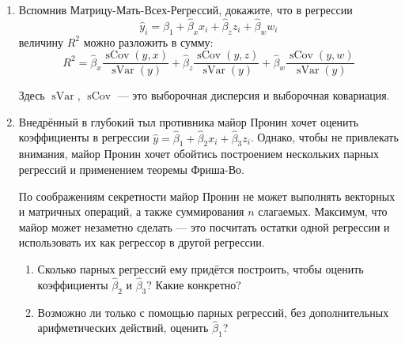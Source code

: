 \documentclass[12pt]{article} %
\theoremstyle{definition} %
\DeclareMathOperator{\sCov}{sCov}
\DeclareMathOperator{\sVar}{sVar}
\def \hb{\hat{\beta}}
\begin{document}
\begin{enumerate}
\newpage
\item Вспомнив Матрицу-Мать-Всех-Регрессий, докажите, что
в регрессии
\[
\hat y_i = \hat\beta_1 + \hat \beta_x x_i + \hat \beta_z z_i + \hat \beta_w w_i
\]
величину $R^2$ можно разложить в сумму:
\[
R^2 = \hat \beta_x \frac{\sCov(y, x)}{\sVar(y)} + \hat \beta_z \frac{\sCov(y, z)}{\sVar(y)} + \hat \beta_w \frac{\sCov(y, w)}{\sVar(y)}
\]

Здесь $\sVar$, $\sCov$ — это выборочная дисперсия и выборочная ковариация. 

\item Внедрённый в глубокий тыл противника майор Пронин хочет оценить коэффициенты 
в регрессии $\hat y = \hb_1 + \hb_2 x_i + \hb_3 z_i$. 
Однако, чтобы не привлекать внимания, майор Пронин хочет обойтись построением нескольких 
парных регрессий и применением теоремы Фриша-Во. 

По соображениям секретности майор Пронин не может выполнять векторных и матричных операций, 
а также суммирования $n$ слагаемых. 
Максимум, что майор может незаметно сделать — это посчитать остатки одной регрессии и
использовать их как регрессор в другой регрессии. 

\begin{enumerate}
  \item Сколько парных регрессий ему придётся построить, чтобы оценить коэффициенты $\hb_2$ и $\hb_3$? Какие конкретно?
  \item Возможно ли только с помощью парных регрессий, без дополнительных арифметических действий, оценить $\hb_1$?
\end{enumerate}


\end{enumerate}
\end{document}
